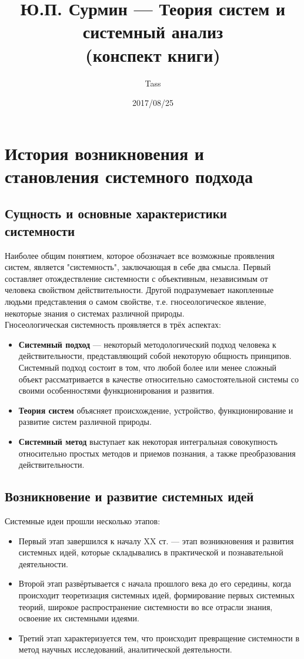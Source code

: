 \documentclass{article}
\newcommand{\important}[1]{\textbf{#1}}
\begin{document}
\title{Ю.П. Сурмин --- Теория систем и системный анализ\\(конспект книги)}
\author{Tass}
\date{2017/08/25}
\maketitle

\tableofcontents
\newpage

\section{История возникновения и становления системного подхода}
\subsection{Сущность и основные характеристики системности}
Наиболее общим понятием, которое обозначает все возможные проявления систем, является "системность", заключающая в себе два смысла. Первый составляет отождествление системности с объективным, независимым от человека свойством действительности. Другой подразумевает накопленные людьми представления о самом свойстве, т.е. гносеологическое явление, некоторые знания о системах различной природы.
\\
Гносеологическая системность проявляется в трёх аспектах:
\begin{itemize}
\item \important{Системный подход} --- некоторый методологический подход человека к действительности, представляющий собой некоторую общность принципов. Системный подход состоит в том, что любой более или менее сложный объект рассматривается в качестве относительно самостоятельной системы со своими особенностями функционирования и развития.
\item \important{Теория систем} объясняет происхождение, устройство, функционирование и развитие систем различной природы.
\item \important{Системный метод} выступает как некоторая интегральная совокупность относительно простых методов и приемов познания, а также преобразования действительности.
\end{itemize}
\subsection{Возникновение и развитие системных идей}
Системные идеи прошли несколько этапов:
\begin{itemize}
\item Первый этап завершился к началу XX ст. --- этап возникновения и развития системных идей, которые складывались в практической и познавательной деятельности.
\item Второй этап развёртывается с начала прошлого века до его середины, когда происходит теоретизация системных идей, формирование первых системных теорий, широкое распространение системности во все отрасли знания, освоение их системными идеями.
\item Третий этап характеризуется тем, что происходит превращение системности в метод научных исследований, аналитической деятельности.
\end{itemize}
\end{document}
